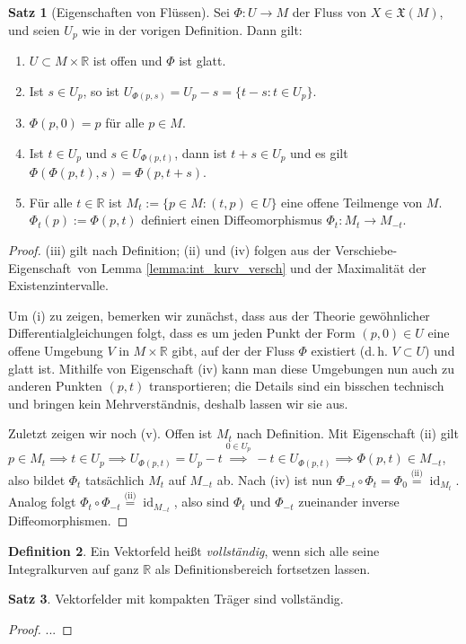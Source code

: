 \documentclass[a4paper]{scrreprt}
\numberwithin{equation}{chapter}
\DeclareMathOperator{\id}{id}
\newcommand{\R}{\mathbb{R}}
\theoremstyle{definition}
\newtheorem{defn}{Definition}[section]
\newtheorem{satz}[defn]{Satz}
\begin{document}
\begin{satz}[Eigenschaften von Flüssen]
	Sei $\Phi\colon U \to M$ der Fluss von $X \in \mathfrak X(M)$, und seien $U_p$ wie in der vorigen Definition. Dann gilt:
	\begin{enumerate}[label=(\roman*)]
		\item $U \subset M \times \R$ ist offen und $\Phi$ ist glatt.
		\item Ist $s \in U_p$, so ist $U_{\Phi(p,s)} = U_p - s = \{t - s : t \in U_p\}$.
		\item $\Phi(p,0) = p$ für alle $p \in M$.
		\item Ist $t \in U_p$ und $s \in U_{\Phi(p,t)}$, dann ist $t+s \in U_p$ und es gilt $\Phi(\Phi(p,t),s) = \Phi(p,t+s)$.
		\item Für alle $t\in\R$ ist $M_t := \{p \in M : (t,p) \in U\}$ eine offene Teilmenge von $M$. $\Phi_t(p) := \Phi(p,t)$ definiert einen Diffeomorphismus $\Phi_t\colon M_t \to M_{-t}$.
	\end{enumerate}

	\begin{proof}
		(iii) gilt nach Definition; (ii) und (iv) folgen aus der \glqq Verschiebe-Eigenschaft\grqq\ von Lemma \ref{lemma:int_kurv_versch} und der Maximalität der Existenzintervalle.

		Um (i) zu zeigen, bemerken wir zunächst, dass aus der Theorie gewöhnlicher Differentialgleichungen folgt, dass es um jeden Punkt der Form $(p,0) \in U$ eine offene Umgebung $V$ in $M\times\R$ gibt, auf der der Fluss $\Phi$ existiert (d.\,h. $V\subset U$) und glatt ist. Mithilfe von Eigenschaft (iv) kann man diese Umgebungen nun auch zu anderen Punkten $(p,t)$ transportieren; die Details sind ein bisschen technisch und bringen kein Mehrverständnis, deshalb lassen wir sie aus.

		Zuletzt zeigen wir noch (v). Offen ist $M_t$ nach Definition. Mit Eigenschaft (ii) gilt $p \in M_t \implies t \in U_p \implies U_{\Phi(p,t)} = U_p - t \overset{0 \in U_p}{\implies} -t \in U_{\Phi(p,t)} \implies \Phi(p,t) \in M_{-t}$, also bildet $\Phi_t$ tatsächlich $M_t$ auf $M_{-t}$ ab. Nach (iv) ist nun $\Phi_{-t} \circ \Phi_t = \Phi_0 \overset{\text{(ii)}}{=} \id_{M_t}$. Analog folgt $\Phi_t \circ \Phi_{-t} \overset{\text{(ii)}}{=} \id_{M_{-t}}$, also sind $\Phi_t$ und $\Phi_{-t}$ zueinander inverse Diffeomorphismen.
	\end{proof}
\end{satz}

\begin{defn}
	Ein Vektorfeld heißt \emph{vollständig}, wenn sich alle seine Integralkurven auf ganz $\R$ als Definitionsbereich fortsetzen lassen.
\end{defn}
\begin{satz}
	Vektorfelder mit kompakten Träger sind vollständig.
	
	\begin{proof}
		... 
	\end{proof}
\end{satz}
\end{document}
